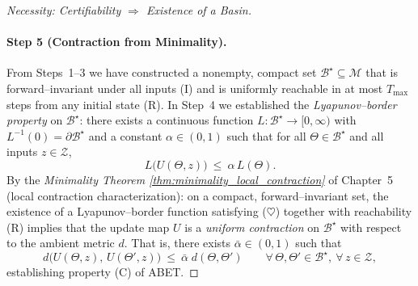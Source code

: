 \documentclass[12pt]{article}
\theoremstyle{definition}
\theoremstyle{plain}
\begin{document}
\begin{proof}[Necessity: Certifiability $\Rightarrow$ Existence of a Basin]
\paragraph{Step 5 (Contraction from Minimality).}
From Steps~1–3 we have constructed a nonempty, compact set $\mathcal B^\star\subseteq\mathcal M$ that is forward–invariant under all inputs \textnormal{(I)} and is uniformly reachable in at most $T_{\max}$ steps from any initial state \textnormal{(R)}. In Step~4 we established the \emph{Lyapunov–border property} on $\mathcal B^\star$: there exists a continuous function $L\colon\mathcal B^\star\!\to[0,\infty)$ with $L^{-1}(0)=\partial\mathcal B^\star$ and a constant $\alpha\in(0,1)$ such that for all $\Theta\in\mathcal B^\star$ and all inputs $z\in\mathcal Z$,
\[
L\bigl(U(\Theta,z)\bigr)\ \le\ \alpha\,L(\Theta).
\tag{$\heartsuit$}
\]
By the \emph{Minimality Theorem \ref{thm:minimality_local_contraction}} of Chapter~5 (local contraction characterization): on a compact, forward–invariant set, the existence of a Lyapunov–border function satisfying \textnormal{($\heartsuit$)} together with reachability \textnormal{(R)} implies that the update map $U$ is a \emph{uniform contraction} on $\mathcal B^\star$ with respect to the ambient metric $d$. That is, there exists $\bar\alpha\in(0,1)$ such that
\[
d\bigl(U(\Theta,z),\,U(\Theta',z)\bigr)\ \le\ \bar\alpha\; d(\Theta,\Theta')
\qquad\forall\,\Theta,\Theta'\in\mathcal B^\star,\ \forall\,z\in\mathcal Z,
\]
establishing property \textnormal{(C)} of ABET.
\qedhere




\end{proof}
\end{document}
